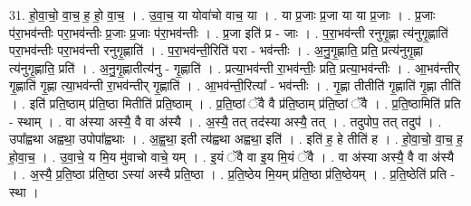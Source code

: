 \documentclass[17pt]{extarticle}
\begin{document}
31. हो॒वा॒चो॒ वा॒च॒ ह॒ हो॒ वा॒च॒ । . उ॒वा॒च॒ या योवा॑चो वाच॒ या । . या प्र॒जाः प्र॒जा या या प्र॒जाः । . प्र॒जाः प॑रा॒भव॑न्तीः परा॒भव॑न्तीः प्र॒जाः प्र॒जाः प॑रा॒भव॑न्तीः । . प्र॒जा इति॑ प्र - जाः । . प॒रा॒भव॑न्ती रनुगृ॒ह्णा त्य॑नुगृ॒ह्णाति॑ परा॒भव॑न्तीः परा॒भव॑न्ती रनुगृ॒ह्णाति॑ । . प॒रा॒भव॑न्ती॒रिति॑ परा - भव॑न्तीः । . अ॒नु॒गृ॒ह्णाति॒ प्रति॒ प्रत्य॑नुगृ॒ह्णा त्य॑नुगृ॒ह्णाति॒ प्रति॑ । . अ॒नु॒गृ॒ह्णातीत्य॑नु - गृ॒ह्णाति॑ । . प्रत्या॒भव॑न्ती रा॒भव॑न्तीः॒ प्रति॒ प्रत्या॒भव॑न्तीः । . आ॒भव॑न्तीर् गृ॒ह्णाति॑ गृ॒ह्णा त्या॒भव॑न्ती रा॒भव॑न्तीर् गृ॒ह्णाति॑ । . आ॒भव॑न्ती॒रित्या᳚ - भव॑न्तीः । . गृ॒ह्णा तीतीति॑ गृ॒ह्णाति॑ गृ॒ह्णा तीति॑ । . इति॑ प्रति॒ष्ठाम् प्र॑ति॒ष्ठा मितीति॑ प्रति॒ष्ठाम् । . प्र॒ति॒ष्ठां ॅवै वै प्र॑ति॒ष्ठाम् प्र॑ति॒ष्ठां ॅवै । . प्र॒ति॒ष्ठामिति॑ प्रति - स्थाम् । . वा अ॑स्या अस्यै॒ वै वा अ॑स्यै । . अ॒स्यै॒ तत् तद॑स्या अस्यै॒ तत् । . तदुपोप॒ तत् तदुप॑ । . उपा᳚ह्वथा अह्वथा॒ उपोपा᳚ह्वथाः । . अ॒ह्व॒था॒ इती त्य॑ह्वथा अह्वथा॒ इति॑ । . इति॑ ह॒ हे तीति॑ ह । . हो॒वा॒चो॒ वा॒च॒ ह॒ हो॒वा॒च॒ । . उ॒वा॒चे॒ य मि॒य मु॑वाचो वाचे॒ यम् । . इ॒यं ॅवै वा इ॒य मि॒यं ॅवै । . वा अ॑स्या अस्यै॒ वै वा अ॑स्यै । . अ॒स्यै॒ प्र॒ति॒ष्ठा प्र॑ति॒ष्ठा ऽस्या॑ अस्यै प्रति॒ष्ठा । . प्र॒ति॒ष्ठेय मि॒यम् प्र॑ति॒ष्ठा प्र॑ति॒ष्ठेयम् । . प्र॒ति॒ष्ठेति॑ प्रति - स्था । \newline
\end{document}
